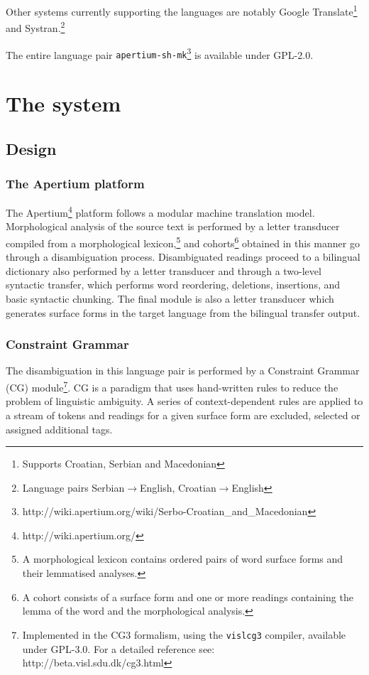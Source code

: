 \documentclass{book}
\begin{document}
Other systems currently supporting the languages are notably Google Translate\footnote{Supports Croatian, Serbian and Macedonian} and Systran.\footnote{Language pairs Serbian$\rightarrow$English, Croatian$\rightarrow$English}

The entire language pair {\small{\tt apertium-sh-mk}}\footnote{http://wiki.apertium.org/wiki/Serbo-Croatian\_and\_Macedonian} is available under GPL-2.0.

\mainmatter

\chapter{The system}
\section{Design}
\subsection* {The Apertium platform}
\nocite{forcada2011apertium}
The Apertium\footnote{http://wiki.apertium.org/}  platform follows a modular machine translation model.
Morphological analysis of the source text is performed by a letter 
transducer compiled from a morphological lexicon,\footnote{A morphological lexicon 
contains ordered pairs of word surface forms and their lemmatised analyses.} 
and cohorts\footnote{A cohort 
consists of a surface form and one or more readings containing the lemma of the 
word and the morphological analysis.} obtained in this manner go through
a disambiguation process. 
Disambiguated readings proceed to a bilingual dictionary also performed 
by a letter transducer and  through a two-level syntactic transfer, which performs word reordering, deletions, insertions, and basic syntactic chunking.
The final module is also a letter transducer which generates surface forms 
in the target language from the bilingual transfer output.

\subsection* {Constraint Grammar}
The 
disambiguation in this language pair is performed by a
Constraint Grammar (CG) module\footnote{Implemented in the CG3 formalism, using the \texttt{vislcg3} compiler, available under GPL-3.0. For a detailed reference see: http://beta.visl.sdu.dk/cg3.html}. CG is a 
paradigm that uses hand-written rules to reduce the problem 
of linguistic ambiguity. A series of context-dependent rules are applied 
to a stream of tokens and readings for a given surface form are excluded, 
selected or assigned additional tags.
\end{document}
